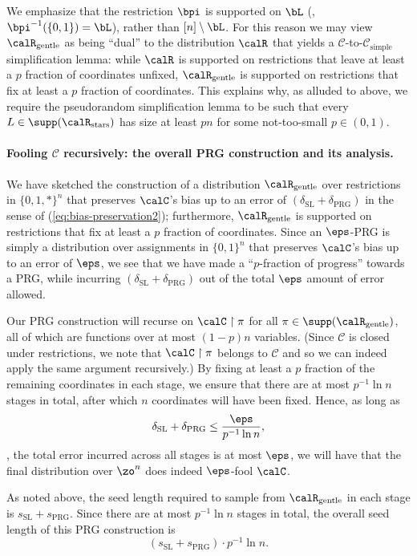 \documentclass{toc}
\theoremstyle{plain}
\newcommand{\uhr}{\upharpoonright}
\newcommand{\simple}{\mathrm{simple}}
\newcommand{\stars}{\mathrm{stars}}
\newcommand{\gentle}{\mathrm{gentle}}
\newcommand{\PRG}{\mathrm{PRG}}
\newcommand{\SL}{\mathrm{SL}}
\begin{document}
We emphasize that the restriction $\bpi$ is supported on $\bL$ (\ie, $\bpi^{-1}(\{0,1\}) = \bL$), rather than $[n] \setminus \bL$.  For this reason we may view $\calR_\gentle$ as being ``dual'' to the distribution $\calR$ that yields a $\mathscr{C}$-to-$\mathscr{C}_\simple$ simplification lemma: while $\calR$ is supported on restrictions that leave at least a $p$ fraction of coordinates unfixed, $\calR_\gentle$ is supported on restrictions that fix at least a $p$ fraction of coordinates. This  explains why,  as alluded to above, we  require the pseudorandom simplification lemma to be such that every $L \in \supp(\calR_\stars)$ has size at least $pn$ for some not-too-small $p\in (0,1)$. 

\vspace{-5pt} 

\paragraph{Fooling $\mathscr{C}$ recursively: the overall PRG construction and its analysis.}  We have sketched the construction of a distribution $\calR_\gentle$ over restrictions in $\{0,1,\ast\}^n$ that preserves $\calC$'s bias up to an error of $(\delta_\SL + \delta_\PRG)$ in the sense of (\ref{eq:bias-preservation2}); furthermore, $\calR_\gentle$ is supported on restrictions that fix at least a $p$ fraction of coordinates. Since an $\eps$-PRG is simply a distribution over assignments in $\{0,1\}^n$ that preserves $\calC$'s bias up to an error of $\eps$, we see that we have made a ``$p$-fraction of progress'' towards a PRG, while incurring $(\delta_\SL + \delta_\PRG)$ out of the total $\eps$ amount of error allowed. 

Our PRG construction will recurse on $\calC \uhr \pi$ for all $\pi \in \supp(\calR_\gentle)$, all of which are functions over at most $(1-p)n$ variables. (Since $\mathscr{C}$ is closed under restrictions, we note that $\calC \uhr \pi$ belongs to $\mathscr{C}$ and so we can indeed apply the same argument recursively.)  By fixing at least a $p$ fraction of the remaining coordinates in each stage, we ensure that there are at most $p^{-1}\ln n$ stages in total, after which $n$ coordinates will have been fixed. Hence, as long as 
\[ \delta_\SL + \delta_\PRG \le \frac{\eps}{p^{-1}\ln n}, \] 
\ie, the total error incurred across all stages is at most $\eps$, we will have that the final distribution over $\zo^n$ does indeed $\eps$-fool $\calC$. 

As noted above, the seed length required to sample from $\calR_\gentle$ in each stage is $s_\SL + s_\PRG$. Since there are at most $p^{-1}\ln n$ stages in total, the overall seed length of this PRG construction is 
\[ (s_\SL + s_\PRG) \cdot p^{-1}\ln n.\] 
\end{document}
